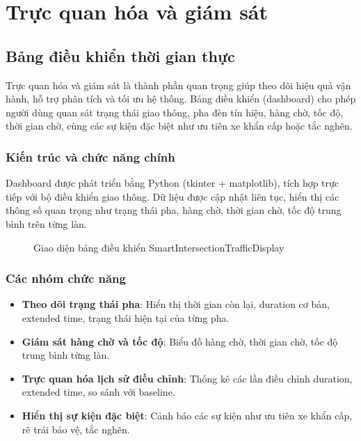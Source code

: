 ﻿%
\chapter{Trực quan hóa và giám sát}

\section{Bảng điều khiển thời gian thực}

Trực quan hóa và giám sát là thành phần quan trọng giúp theo dõi hiệu quả vận hành, hỗ trợ phân tích và tối ưu hệ thống. Bảng điều khiển (dashboard) cho phép người dùng quan sát trạng thái giao thông, pha đèn tín hiệu, hàng chờ, tốc độ, thời gian chờ, cùng các sự kiện đặc biệt như ưu tiên xe khẩn cấp hoặc tắc nghẽn.

\subsection{Kiến trúc và chức năng chính}
Dashboard được phát triển bằng Python (tkinter + matplotlib), tích hợp trực tiếp với bộ điều khiển giao thông. Dữ liệu được cập nhật liên tục, hiển thị các thông số quan trọng như trạng thái pha, hàng chờ, thời gian chờ, tốc độ trung bình trên từng làn.

\begin{figure}[H]
    \centering
    \caption{Giao diện bảng điều khiển SmartIntersectionTrafficDisplay}
    \label{fig:dashboard_gui}
\end{figure}

\subsection{Các nhóm chức năng}
\begin{itemize}
    \item \textbf{Theo dõi trạng thái pha}: Hiển thị thời gian còn lại, duration cơ bản, extended time, trạng thái hiện tại của từng pha.
    \item \textbf{Giám sát hàng chờ và tốc độ}: Biểu đồ hàng chờ, thời gian chờ, tốc độ trung bình từng làn.
    \item \textbf{Trực quan hóa lịch sử điều chỉnh}: Thống kê các lần điều chỉnh duration, extended time, so sánh với baseline.
    \item \textbf{Hiển thị sự kiện đặc biệt}: Cảnh báo các sự kiện như ưu tiên xe khẩn cấp, rẽ trái bảo vệ, tắc nghẽn.
\end{itemize}

